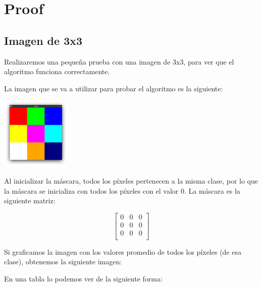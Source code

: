 \section{Proof}\label{sec:proof}

\subsection{Imagen de 3x3}\label{subsec:imagen-de-3x3}

Realizaremos una pequeña prueba con una imagen de 3x3, para ver que el algoritmo funciona correctamente.

La imagen que se va a utilizar para probar el algoritmo es la siguiente:

\includegraphics[width=0.25\textwidth]{./latex/img/original}

Al inicializar la máscara, todos los píxeles pertenecen a la misma clase, por lo que la máscara se inicializa con todos los píxeles con el valor 0.
La máscara es la siguiente matriz:

    \begin{equation*}
        \begin{bmatrix}
            0 & 0 & 0 \\
            0 & 0 & 0 \\
            0 & 0 & 0 \\
        \end{bmatrix}
    \end{equation*}

Si graficamos la imagen con los valores promedio de todos los píxeles (de esa clase), obtenemos la siguiente imagen:

En una tabla lo podemos ver de la siguiente forma:

